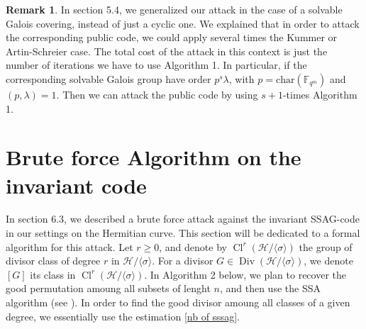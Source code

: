 \documentclass[10pt]{article}
\theoremstyle{definition}
\newtheorem{rq1}[thm]{Remark}
\theoremstyle{definition}
\theoremstyle{definition}
\newcommand{\s}{\vspace{0.3cm}}
\newcommand{\fqm}{\mathbb{F}_{q^m}}
\newcommand{\Div}{\operatorname{Div}}
\newcommand{\Cl}{\operatorname{Cl}}
\begin{document}
\s


\begin{rq1}
In section 5.4, we generalized our attack in the case of a solvable Galois covering, instead of just a cyclic one. We explained that in order to attack the corresponding public code, we could apply several times the Kummer or Artin-Schreier case. The total cost of the attack in this context is just the number of iterations we have to use Algorithm 1. In particular, if the corresponding solvable Galois group have order $p^s\lambda$, with $p=\mathrm{char}(\fqm)$ and $(p,\lambda)=1$. Then we can attack the public code by using $s+1$-times Algorithm 1.
\end{rq1}

\s

\section{Brute force Algorithm on the invariant code}

\s

In section 6.3, we described a brute force attack against the invariant SSAG-code in our settings on the Hermitian curve. This section will be dedicated to a formal algorithm for this attack. 
Let $r \geq 0$, and denote by $\Cl^r(\mathcal{H}/\langle \sigma \rangle)$ the group of divisor class of degree $r$ in $\mathcal{H}/\langle \sigma \rangle$. For a divisor $G \in \Div(\mathcal{H}/\langle \sigma \rangle)$, we denote $[G]$ its class in $\Cl^r(\mathcal{H}/\langle \sigma \rangle)$. In Algorithm 2 below, we plan to recover the good permutation amoung all subsets of lenght $n$, and then use the SSA algorithm (see \cite{SSA}). In order to find the good divisor amoung all classes of a given degree, we essentially use the estimation \eqref{nb of sssag}.
\end{document}

